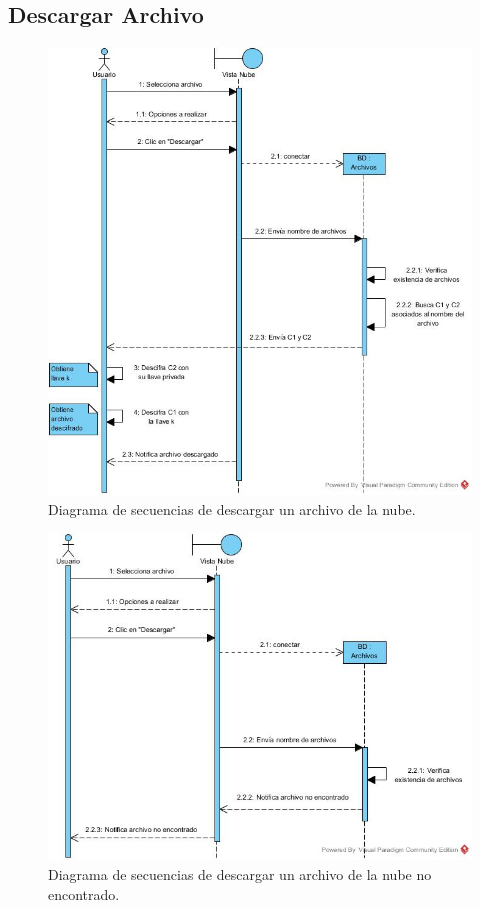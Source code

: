 \subsection{Descargar Archivo}

\begin{figure}[htbp!]
		\centering
			\includegraphics[width=1\textwidth]{images/Descargar_Archivo}
		\caption{Diagrama de secuencias de descargar un archivo de la nube.}
\end{figure}

\begin{figure}[htbp!]
		\centering
			\includegraphics[width=1\textwidth]{images/Descargar_aleternativa_a}
		\caption{Diagrama de secuencias de descargar un archivo de la nube no encontrado.}
\end{figure} 
\newpage

